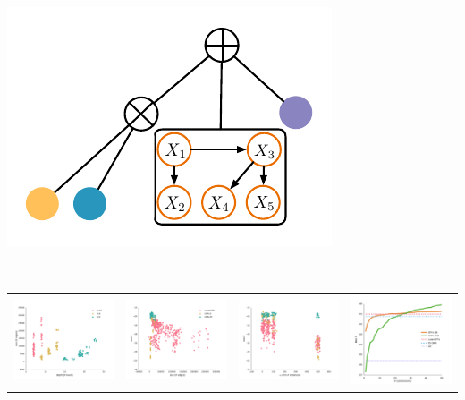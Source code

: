 \documentclass[xcolor={usenames,dvipsnames,svgnames}, compress]{beamer}
\begin{document}
\begin{frame}
\begin{minipage}[t]{2.43cm}
  \end{minipage}\hspace{3pt}\begin{minipage}[t]{2.43cm}
      \includegraphics[width=\linewidth]{figures/spn-clt}                                             
  \end{minipage}\\[-25pt]
  \begin{table}[ht]
    \setlength{\tabcolsep}{3pt}  
    \centering
    \begin{tabular}[t]{c c c c}
      \includegraphics[width=0.23\linewidth]{figures/plants-depth.pdf}&\includegraphics[width=0.23\linewidth]{figures/ll-depth/10-8/pumsb-star-ll-depth}&\includegraphics[width=0.23\linewidth]{figures/ll-m/10-8/pumsb-star-ll-m}&\includegraphics[width=0.23\linewidth]{figures/curves/dna-png.pdf}\\
    \end{tabular}
  \end{table}
      
\end{frame}
\end{document}
